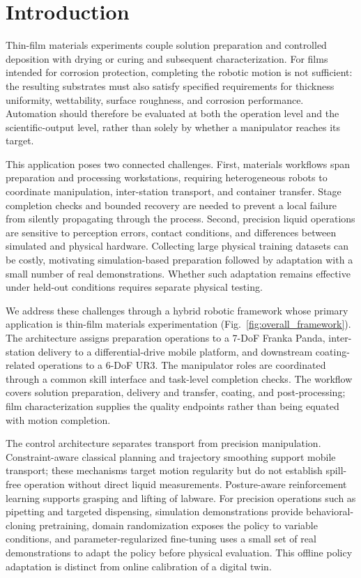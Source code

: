 \section{Introduction}
\label{sec:introduction}

Thin-film materials experiments couple solution preparation and controlled deposition with drying or curing and subsequent characterization. For films intended for corrosion protection, completing the robotic motion is not sufficient: the resulting substrates must also satisfy specified requirements for thickness uniformity, wettability, surface roughness, and corrosion performance. Automation should therefore be evaluated at both the operation level and the scientific-output level, rather than solely by whether a manipulator reaches its target.

This application poses two connected challenges. First, materials workflows span preparation and processing workstations, requiring heterogeneous robots to coordinate manipulation, inter-station transport, and container transfer. Stage completion checks and bounded recovery are needed to prevent a local failure from silently propagating through the process. Second, precision liquid operations are sensitive to perception errors, contact conditions, and differences between simulated and physical hardware. Collecting large physical training datasets can be costly, motivating simulation-based preparation followed by adaptation with a small number of real demonstrations. Whether such adaptation remains effective under held-out conditions requires separate physical testing.

We address these challenges through a hybrid robotic framework whose primary application is thin-film materials experimentation (Fig.~\ref{fig:overall_framework}). The architecture assigns preparation operations to a 7-DoF Franka Panda, inter-station delivery to a differential-drive mobile platform, and downstream coating-related operations to a 6-DoF UR3. The manipulator roles are coordinated through a common skill interface and task-level completion checks. The workflow covers solution preparation, delivery and transfer, coating, and post-processing; film characterization supplies the quality endpoints rather than being equated with motion completion.

The control architecture separates transport from precision manipulation. Constraint-aware classical planning and trajectory smoothing support mobile transport; these mechanisms target motion regularity but do not establish spill-free operation without direct liquid measurements. Posture-aware reinforcement learning supports grasping and lifting of labware. For precision operations such as pipetting and targeted dispensing, simulation demonstrations provide behavioral-cloning pretraining, domain randomization exposes the policy to variable conditions, and parameter-regularized fine-tuning uses a small set of real demonstrations to adapt the policy before physical evaluation. This offline policy adaptation is distinct from online calibration of a digital twin.

